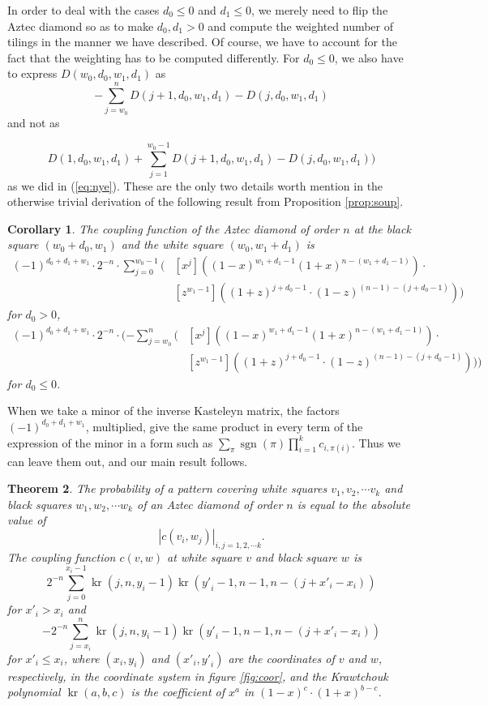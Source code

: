\documentclass[10pt,reqno]{amsart}
\theoremstyle{plain}
\newtheorem{Thm}{Theorem}
\newtheorem{Cor}[Thm]{Corollary}
\theoremstyle{definition}
\theoremstyle{remark}
\def\determinant#1{\left|#1\right|}
\DeclareMathOperator{\sgn }{sgn }
\DeclareMathOperator{\kr }{kr}
\begin{document}
In order to deal with the cases $d_0\leq 0$ and $d_1\leq 0$,
we merely need to flip
the Aztec diamond so as to make $d_0,d_1>0$ and
compute the weighted number of tilings in the manner we have described.
Of course, we have to account for the fact that the weighting has to
be computed differently. For $d_0\leq 0$, we also have to express
$D(w_0,d_0,w_1,d_1)$ as
\[
- \sum_{j=w_0}^n D(j+1,d_0,w_1,d_1)-D(j,d_0,w_1,d_1)
\] and not as

\[
D(1,d_0,w_1,d_1) +
\sum_{j=1}^{w_0-1} D(j+1,d_0,w_1,d_1)-D(j,d_0,w_1,d_1)) 
\]
as we did in (\ref{eq:nye}). These are the only two details worth mention
in the otherwise trivial derivation of the following result
from Proposition \ref{prop:soup}.
\begin{Cor}
The coupling function of the Aztec diamond of order
 $n$ at the black square $(w_0+d_0,w_1)$
and the white square $(w_0,w_1+d_1)$ is
\begin{equation}
\begin{aligned}
(-1)^{d_0+d_1+w_1}\cdot 2^{-n}\cdot 
\sum_{j=0}^{w_0-1}
(&[x^j]((1-x)^{w_1+d_1-1}(1+x)^{n-(w_1+d_1-1)})\cdot \\
&[z^{w_1-1}]((1+z)^{j+d_0-1} \cdot (1-z)^{(n-1)-(j+d_0-1)}))
\end{aligned}
\end{equation}
for $d_0>0$,
\begin{equation}
\begin{aligned}
(-1)^{d_0+d_1+w_1}\cdot 2^{-n}\cdot 
(-\sum_{j=w_0}^n
(&[x^j]((1-x)^{w_1+d_1-1}(1+x)^{n-(w_1+d_1-1)})\cdot \\
&[z^{w_1-1}]((1+z)^{j+d_0-1} \cdot (1-z)^{(n-1)-(j+d_0-1)})))
\end{aligned}
\end{equation}
for $d_0\leq 0$.
\end{Cor}
When we take a minor of the inverse Kasteleyn matrix,
the factors $(-1)^{d_0+d_1+w_1}$, multiplied, give the same product
in every term of the expression of the minor in a form such as
$\sum_{\pi} \sgn(\pi ) \prod_{i=1}^k c_{i,\pi(i)}$. Thus we can
leave them out, and our main
result follows.
\begin{Thm}
The probability of a pattern covering white squares $v_1,v_2,\dotsb v_k$
and black squares $w_1,w_2,\dotsb w_k$ of
 an Aztec diamond of order $n$ is equal
to the absolute value of
\[\determinant{c(v_i,w_j)}_{i,j=1,2,\dotsb k}.\]
The {\em coupling function} $c(v,w)$ at white square $v$ and black
square $w$ is 
\[2^{-n} \sum_{j=0}^{x_i-1} \kr(j,n,y_i-1) 
			    \kr({y\prime }_i - 1,n-1,n-(j+{x\prime }_i-x_i))
\]
for ${x\prime }_i > x_i$ and
\[-2^{-n} \sum_{j=x_i}^n \kr(j,n,y_i-1) 
			 \kr({y\prime }_i-1,n-1,n-(j+{x\prime }_i-x_i))
\]
for ${x\prime }_i \leq x_i$, where $(x_i,y_i)$ and $({x\prime}_i,{y\prime}_i)$
are the coordinates of $v$ and $w$, respectively, in the coordinate
system in figure \ref{fig:coor}, and the {\em Krawtchouk polynomial}
$\kr(a,b,c)$ is the coefficient of $x^a$ in $(1-x)^c\cdot (1+x)^{b-c}$.
\end{Thm}
\end{document}
